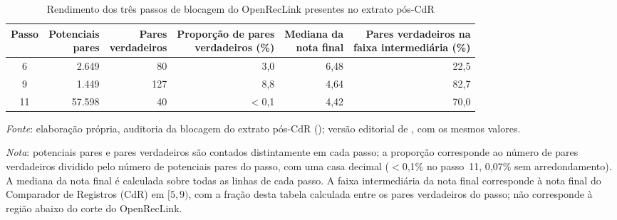 \begin{table}[htbp]
\centering
\caption{Rendimento dos três passos de blocagem do OpenRecLink presentes no extrato pós-CdR}
\label{tab:blocagem-rendimento}
\small
\setlength{\tabcolsep}{4pt}
\begin{tabular}{crrrrr}
\toprule
Passo & \shortstack{Potenciais\\pares} & \shortstack{Pares\\verdadeiros} & \shortstack{Proporção de pares\\verdadeiros (\%)} & \shortstack{Mediana da\\nota final} & \shortstack{Pares verdadeiros na\\faixa intermediária (\%)} \\
\midrule
6  & 2.649  & 80  & 3,0  & 6,48 & 22,5 \\
9  & 1.449  & 127 & 8,8  & 4,64 & 82,7 \\
11 & 57.598 & 40  & $<$0,1 & 4,42 & 70,0 \\
\bottomrule
\end{tabular}

\smallskip
{\footnotesize\textit{Fonte}: elaboração própria, auditoria da blocagem do extrato pós-CdR (); versão editorial de , com os mesmos valores.
\par\textit{Nota}: potenciais pares e pares verdadeiros são contados distintamente em cada passo; a proporção corresponde ao número de pares verdadeiros dividido pelo número de potenciais pares do passo, com uma casa decimal ($<$0,1\% no passo~11, 0,07\% sem arredondamento). A mediana da nota final é calculada sobre todas as linhas de cada passo. A faixa intermediária da nota final corresponde à nota final do Comparador de Registros (CdR) em $[5,9)$, com a fração desta tabela calculada entre os pares verdadeiros do passo; não corresponde à região abaixo do corte do OpenRecLink.}
\end{table}
